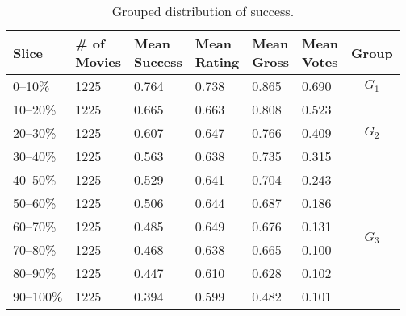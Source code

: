 \begin{table}[tb]
\caption{\label{tab:success_groups} Grouped distribution of success.}
\centering
\begin{tabular}{@{}llllllc@{}}
\toprule
Slice    & \xcell{\# of\\Movies} & \xcell{Mean\\Success} & \xcell{Mean\\Rating} & \xcell{Mean\\Gross} & \xcell{Mean\\Votes} & Group\\ \midrule
0--10\%   & 1225  & 0.764       & 0.738    & 0.865   & 0.690   & $G_1$                  \\ \midrule
10--20\%  & 1225  & 0.665       & 0.663    & 0.808   & 0.523   & \multirow{3}{*}{$G_2$} \\
20--30\%  & 1225  & 0.607       & 0.647    & 0.766   & 0.409   &                     \\
30--40\%  & 1225  & 0.563       & 0.638    & 0.735   & 0.315   &                     \\ \midrule
40--50\%  & 1225  & 0.529       & 0.641    & 0.704   & 0.243   & \multirow{6}{*}{$G_3$} \\
50--60\%  & 1225  & 0.506       & 0.644    & 0.687   & 0.186   &                     \\
60--70\%  & 1225  & 0.485       & 0.649    & 0.676   & 0.131   &                     \\
70--80\%  & 1225  & 0.468       & 0.638    & 0.665   & 0.100   &                     \\
80--90\%  & 1225  & 0.447       & 0.610    & 0.628   & 0.102   &                     \\
90--100\% & 1225  & 0.394       & 0.599    & 0.482   & 0.101   &                     \\ \midrule
\end{tabular}
\end{table}
